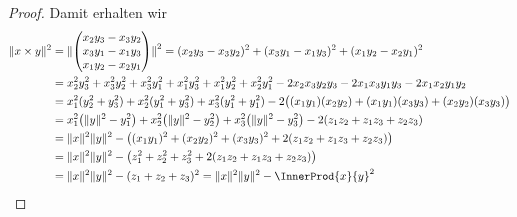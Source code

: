 \documentclass[../full]{subfiles}
\begin{document}
\begin{proof}
        Damit erhalten wir
        \begin{align*}
            \norm{x \times y}^2 &
            = \norm[\Bigger]{ \begin{pmatrix}
                    x_2 y_3 - x_3 y_2 \\ x_3 y_1 - x_1 y_3 \\ x_1 y_2 - x_2 y_1
                \end{pmatrix} }^2
            = \paren{x_2 y_3 - x_3 y_2}^2
                + \paren{x_3 y_1 - x_1 y_3}^2
                + \paren{x_1 y_2 - x_2 y_1}^2
            \\ &
            = x_2^2 y_3^2 + x_3^2 y_2^2
                + x_3^2 y_1^2 + x_1^2 y_3^2
                + x_1^2 y_2^2 + x_2^2 y_1^2
                - 2 x_2 x_3 y_2 y_3 - 2 x_1 x_3 y_1 y_3 - 2 x_1 x_2 y_1 y_2
            \\ &
            = x_1^2 \paren{y_2^2 + y_3^2}
                + x_2^2 \paren{y_1^2 + y_3^2}
                + x_3^2 \paren{y_1^2 + y_1^2}
                - 2 \paren[\big]{
                    \paren{x_1 y_1} \paren{x_2 y_2}
                    + \paren{x_1 y_1} \paren{x_3 y_3}
                    + \paren{x_2 y_2} \paren{x_3 y_3}
                }
            \\ &
            = x_1^2 \paren[\big]{\norm{y}^2 - y_1^2}
                + x_2^2 \paren[\big]{\norm{y}^2 - y_2^2}
                + x_3^2 \paren[\big]{\norm{y}^2 - y_3^2}
                - 2 \paren{z_1 z_2 + z_1 z_3 + z_2 z_3}
            \\ &
            = \norm{x}^2 \norm{y}^2 - \paren[\big]{
                \paren{x_1 y_1}^2 + \paren{x_2 y_2}^2 + \paren{x_3 y_3}^2
                + 2 \paren{z_1 z_2 + z_1 z_3 + z_2 z_3}
            }
            \\ &
            = \norm{x}^2 \norm{y}^2 - \paren[\big]{
                z_1^2 + z_2^2 + z_3^2 + 2 \paren{z_1 z_2 + z_1 z_3 + z_2 z_3}
            }
            \\ &
            = \norm{x}^2 \norm{y}^2 - \paren{z_1 + z_2 + z_3}^2
            = \norm{x}^2 \norm{y}^2 - \InnerProd{x}{y}^2
            \qedhere
        \end{align*}
    \end{proof}
\end{document}
